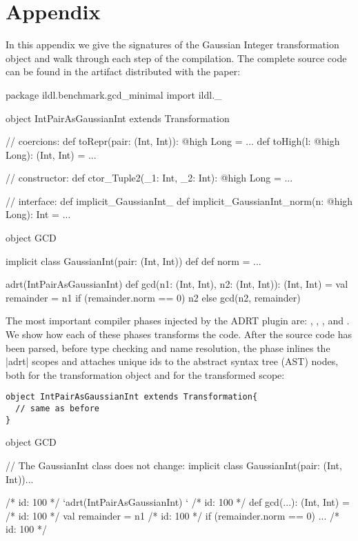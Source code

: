 \section*{Appendix}

In this appendix we give the signatures of the Gaussian Integer transformation object and walk through each step of the compilation. The complete source code can be found in the artifact distributed with the paper:

\begin{lstlisting-nobreak}
package ildl.benchmark.gcd_minimal
import ildl._

object IntPairAsGaussianInt extends Transformation{
  // coercions:
  def toRepr(pair: (Int, Int)): @high Long = ...
  def toHigh(l: @high Long): (Int, Int) = ...

  // constructor:
  def ctor_Tuple2(_1: Int, _2: Int): @high Long = ...

  // interface:
  def implicit_GaussianInt_%
  def implicit_GaussianInt_norm(n: @high Long): Int = ...
}

object GCD {
  implicit class GaussianInt(pair: (Int, Int)) {
    def %
    def norm = ...
  }

  adrt(IntPairAsGaussianInt) {
    def gcd(n1: (Int, Int), n2: (Int, Int)): (Int, Int) = {
      val remainder = n1 %
      if (remainder.norm == 0) n2 else gcd(n2, remainder)
    }
  }
}
\end{lstlisting-nobreak}

The most important compiler phases injected by the ADRT plugin are: \postparser{}, \inject{}, \bridge{}, \coerce{} and \commit{}. We show how each of these phases transforms the code. After the source code has been parsed, before type checking and name resolution, the \postparser{} phase inlines the |adrt| scopes and attaches unique ids to the abstract syntax tree (AST) nodes, both for the transformation object and for the transformed scope:

\vspace{-0.3em}
\begin{lstlisting}
object IntPairAsGaussianInt extends Transformation{
  // same as before
}
\end{lstlisting}

\begin{lstlisting-nobreak}
object GCD {
  // The GaussianInt class does not change:
  implicit class GaussianInt(pair: (Int, Int))...

  /* id: 100 */ `adrt(IntPairAsGaussianInt) {}`
  /* id: 100 */ def gcd(...): (Int, Int) = {
  /* id: 100 */        val remainder = n1 %
  /* id: 100 */        if (remainder.norm == 0) ...
  /* id: 100 */ }
}
\end{lstlisting-nobreak}

